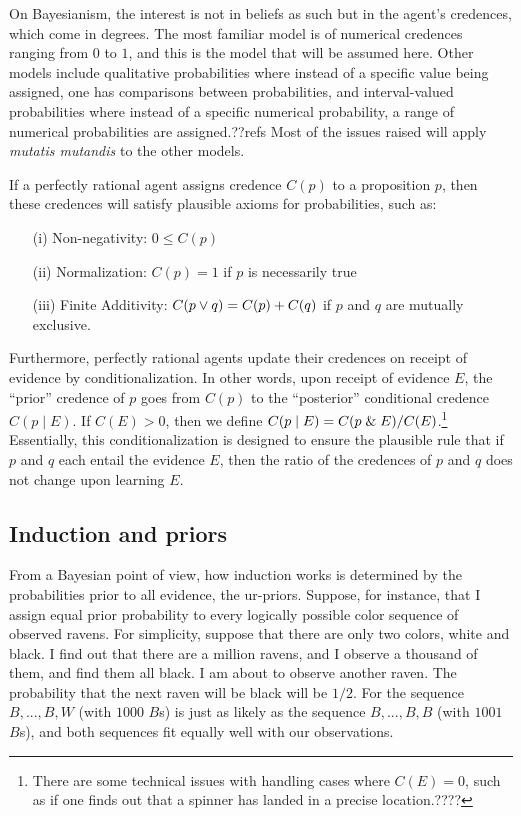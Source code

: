 On Bayesianism, the interest is not in beliefs as such but in the agent's credences, which come in degrees. The 
most familiar model is of numerical credences ranging from $0$ to $1$, and this is the model that will be assumed
here. Other models include qualitative probabilities where instead of a specific value being assigned, one has 
comparisons between probabilities, and interval-valued probabilities where instead of a specific numerical
probability, a range of numerical probabilities are assigned.??refs Most of the issues raised will apply 
\textit{mutatis mutandis} to the other models.

If a perfectly rational agent assigns credence $C(p)$ to a proposition $p$, then these credences will 
satisfy plausible axioms for probabilities, such as:
\begin{enumerate}
\item[(i)] Non-negativity: $0 \le C(p)$
\item[(ii)] Normalization: $C(p)=1$ if $p$ is necessarily true
\item[(iii)] Finite Additivity: $C(p\vee q)=C(p)+C(q)$ if $p$ and $q$ are mutually exclusive.
\end{enumerate}

Furthermore, perfectly rational agents update their credences on receipt of evidence by conditionalization.
In other words, upon receipt of evidence $E$, the ``prior'' credence of $p$ goes from $C(p)$ to the 
``posterior'' conditional credence $C(p\mid E)$. If $C(E)>0$, then we define $C(p\mid E)=C(p\mathrel{\&} E)/C(E)$.\footnote{There 
are some technical issues with handling cases where $C(E)=0$, such as if one finds out that a spinner
has landed in a precise location.????} Essentially, this conditionalization is designed to ensure the 
plausible rule that if $p$ and $q$ each entail the evidence $E$, then the ratio of the credences of $p$ and $q$ 
does not change upon learning $E$. 

\subsection{Induction and priors}
From a Bayesian point of view, how induction works is determined by the probabilities prior to all evidence, the ur-priors.
Suppose, for instance, that I assign equal prior probability to every logically possible color sequence of observed ravens. 
For simplicity, suppose that there are only two colors, white and black.  I find out that there are a million ravens, and 
I observe a thousand of them, and find them all black. I am about to observe another raven. The probability that the next 
raven will be black will be $1/2$. For the sequence $B,...,B,W$ (with $1000$ $B$s) is just as likely as the sequence
$B,...,B,B$ (with $1001$ $B$s), and both sequences fit equally well with our observations. 

